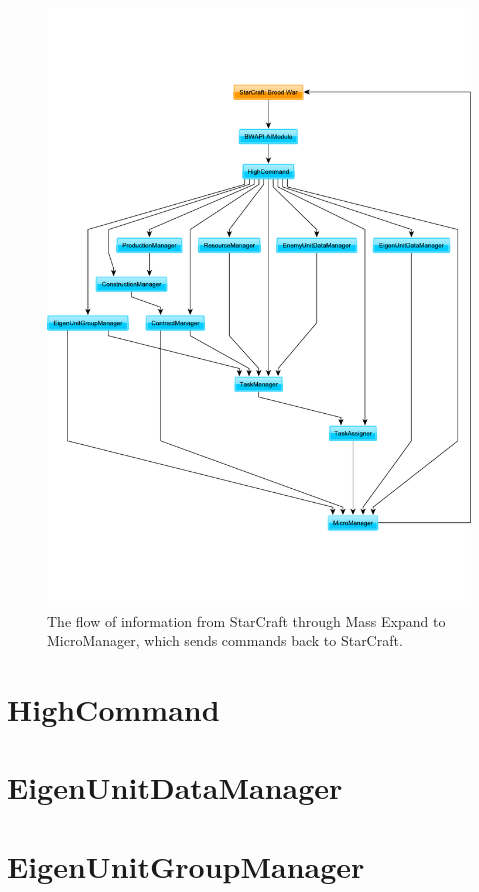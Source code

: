 \begin{figure}[htb]
\centering
\includegraphics[width=\textwidth, trim= 0mm 30mm 0mm 30mm, clip]{images/flowofinformation}
\caption{The flow of information from StarCraft through Mass Expand to MicroManager, which sends commands back to StarCraft.}
\label{fig:flowofinformation}
\end{figure}

\section{HighCommand}

\section{EigenUnitDataManager}

\section{EigenUnitGroupManager}

